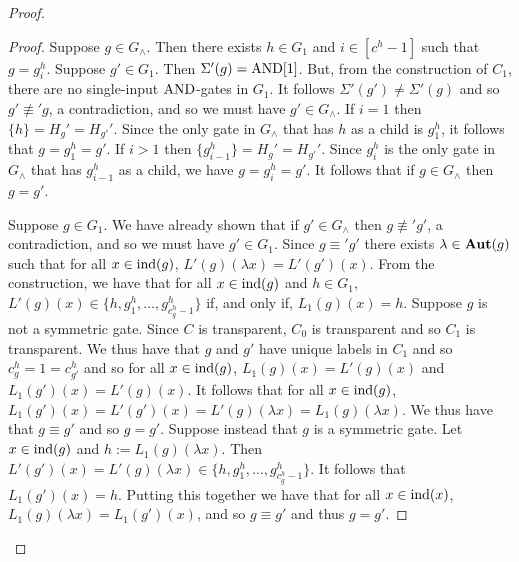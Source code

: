 \documentclass[../paper.tex]{subfiles}
\begin{document}
\begin{proof}
\begin{proof}
    
    Suppose $g \in G_{\land}$. Then there exists $h \in G_1$ and $i \in [c^h -
    1]$ such that $g = g^h_i$. Suppose $g' \in G_1$. Then $\Sigma'(g) =
    \text{\upshape AND}[1]$. But, from the construction of $C_1$, there are no single-input
    $\text{\upshape AND}$-gates in $G_1$. It follows $\Sigma'(g') \neq \Sigma'(g)$ and so $g'
    \not\equiv' g$, a contradiction, and so we must have $g' \in G_{\land}$. If
    $i = 1$ then $\{ h \} = H_g' = H_{g'}'$.  Since the only gate in $G_\land$
    that has $h$ as a child is $g^h_1$, it follows that $g = g^h_1 = g'$.
    If $i > 1$ then $\{g^{h}_{i-1}\} = H_g' = H_{g'}'$. Since $g^h_i$ is the
    only gate in $G_\land$ that has $g^h_{i-1}$ as a child, we have $g =
    g^h_i = g'$. It follows that if $g \in G_\land$ then $g = g'$.

    Suppose $g \in G_1$. We have already shown that if $g' \in G_\land$ then $g
    \not\equiv' g'$, a contradiction, and so we must have $g' \in G_1$. Since $g
    \equiv' g'$ there exists $\lambda \in \text{\textbf{Aut}}(g)$ such that for all $x \in
    \text{\upshape ind}(g)$, $L'(g)(\lambda x) = L'(g')(x)$. From the construction, we have
    that for all $x \in \text{\upshape ind}(g)$ and $h \in G_1$, $L'(g)(x) \in \{h, g^h_1 ,
    \ldots, g^h_{c^h_g -1}\}$ if, and only if, $L_1(g)(x) = h$. Suppose $g$ is
    not a symmetric gate. Since $C$ is transparent, $C_0$ is transparent and so
    $C_1$ is transparent. We thus have that $g$ and $g'$ have unique labels in
    $C_1$ and so $c^h_g = 1 = c^h_{g'}$ and so for all $x \in \text{\upshape ind}(g)$,
    $L_1(g)(x) = L'(g)(x)$ and $L_1(g')(x) = L'(g)(x)$. It follows that for all
    $x \in \text{\upshape ind}(g)$, $L_1(g')(x) = L'(g')(x) = L'(g)(\lambda x) = L_1(g)(\lambda
    x)$. We thus have that $g \equiv g'$ and so $g = g'$. Suppose instead that
    $g$ is a symmetric gate. Let $x \in \text{\upshape ind}(g)$ and $h := L_1(g)(\lambda x)$.
    Then $L' (g')(x) = L'(g)(\lambda x) \in \{h, g^h_1, \ldots , g^h_{c^h_g -
      1}\}$. It follows that $L_1(g')(x) = h$. Putting this together we have
    that for all $x \in \text{\upshape ind}(x)$, $L_1(g) (\lambda x) = L_1(g')(x)$, and so $g
    \equiv g'$ and thus $g = g'$.
    


\end{proof}
\end{proof}
\end{document}
